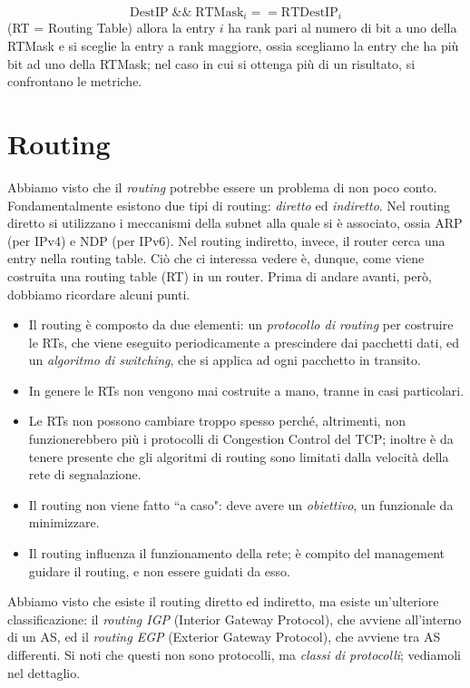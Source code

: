 $$\text{DestIP}\;\&\&\;\text{RTMask}_i == \text{RTDestIP}_i$$
(RT = Routing Table) allora la entry $i$ ha rank pari al numero di bit a uno della RTMask e si sceglie la entry a rank maggiore, ossia scegliamo la entry che ha più bit ad uno della RTMask; nel caso in cui si ottenga più di un risultato, si confrontano le metriche.

\section{Routing}
Abbiamo visto che il \textit{routing} potrebbe essere un problema di non poco conto. Fondamentalmente esistono due tipi di routing: \textit{diretto} ed \textit{indiretto}. Nel routing diretto si utilizzano i meccanismi della subnet alla quale si è associato, ossia ARP (per IPv4) e NDP (per IPv6). Nel routing indiretto, invece, il router cerca una entry nella routing table. Ciò che ci interessa vedere è, dunque, come viene costruita una routing table (RT) in un router. Prima di andare avanti, però, dobbiamo ricordare alcuni punti.\\
\begin{itemize}
	\item Il routing è composto da due elementi: un \textit{protocollo di routing} per costruire le RTs, che viene eseguito periodicamente a prescindere dai pacchetti dati, ed un \textit{algoritmo di switching}, che si applica ad ogni pacchetto in transito.
	\item In genere le RTs non vengono mai costruite a mano, tranne in casi particolari.
	\item Le RTs non possono cambiare troppo spesso perché, altrimenti, non funzionerebbero più i protocolli di Congestion Control del TCP; inoltre è da tenere presente che gli algoritmi di routing sono limitati dalla velocità della rete di segnalazione.
	\item Il routing non viene fatto \textquotedblleft a caso": deve avere un \textit{obiettivo}, un funzionale da minimizzare.
	\item Il routing influenza il funzionamento della rete; è compito del management guidare il routing, e non essere guidati da esso.
\end{itemize}
Abbiamo visto che esiste il routing diretto ed indiretto, ma esiste un'ulteriore classificazione: il \textit{routing IGP} (Interior Gateway Protocol), che avviene all'interno di un AS, ed il \textit{routing EGP} (Exterior Gateway Protocol), che avviene tra AS differenti. Si noti che questi non sono protocolli, ma \textit{classi di protocolli}; vediamoli nel dettaglio.

